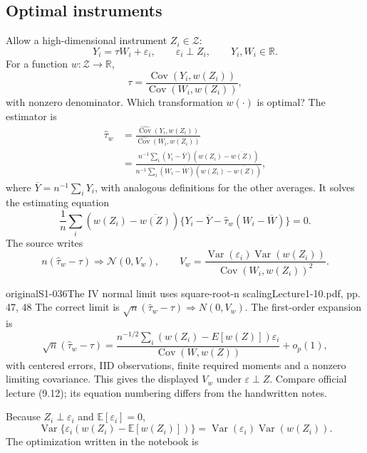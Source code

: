 \subsection{Optimal instruments}
Allow a high-dimensional instrument $Z_i\in\mathcal Z$:
\[
 Y_i=\tau W_i+\varepsilon_i,\qquad\varepsilon_i\perp Z_i,
 \qquad Y_i,W_i\in\mathbb R.
\]
For a function $w:\mathcal Z\to\mathbb R$,
\[
 \tau=\frac{\operatorname{Cov}(Y_i,w(Z_i))}
 {\operatorname{Cov}(W_i,w(Z_i))},\tag{9.8}
\]
with nonzero denominator. Which transformation $w(\cdot)$ is optimal? The estimator is
\begin{align*}
 \widehat\tau_w
 &=\frac{\widehat{\operatorname{Cov}}(Y_i,w(Z_i))}
 {\widehat{\operatorname{Cov}}(W_i,w(Z_i))}\\
 &=\frac{n^{-1}\sum_i(Y_i-\overline Y)(w(Z_i)-\overline{w(Z)})}
 {n^{-1}\sum_i(W_i-\overline W)(w(Z_i)-\overline{w(Z)})},\tag{9.9}
\end{align*}
where $\overline Y=n^{-1}\sum_iY_i$, with analogous definitions for the other averages. It solves the estimating equation
\[
 \frac1n\sum_i(w(Z_i)-\overline{w(Z)})
 \{Y_i-\overline Y-\widehat\tau_w(W_i-\overline W)\}=0.\tag{9.10}
\]
The source writes
\[
 n(\widehat\tau_w-\tau)\Rightarrow\mathcal N(0,V_w),
 \qquad
 V_w=\frac{\operatorname{Var}(\varepsilon_i)\operatorname{Var}(w(Z_i))}
 {\operatorname{Cov}(W_i,w(Z_i))^2}.\tag{9.11, source scaling}
\]
\begin{reviewnote}{original}{S1-036}{The IV normal limit uses square-root-n scaling}{Lecture1-10.pdf, pp. 47, 48}
The correct limit is $\sqrt n(\widehat\tau_w-\tau)\Rightarrow N(0,V_w)$. The first-order expansion is
\[
\sqrt n(\widehat\tau_w-\tau)=
\frac{n^{-1/2}\sum_i(w(Z_i)-E[w(Z)])\varepsilon_i}
{\operatorname{Cov}(W,w(Z))}+o_p(1),
\]
with centered errors, IID observations, finite required moments and a nonzero limiting covariance. This gives the displayed $V_w$ under $\varepsilon\perp Z$. Compare official lecture (9.12); its equation numbering differs from the handwritten notes.
\end{reviewnote}



Because $Z_i\perp\varepsilon_i$ and $\mathbb E[\varepsilon_i]=0$,
\[
 \operatorname{Var}\{\varepsilon_i(w(Z_i)-\mathbb E[w(Z_i)])\}
 =\operatorname{Var}(\varepsilon_i)\operatorname{Var}(w(Z_i)).
\]
The optimization written in the notebook is

